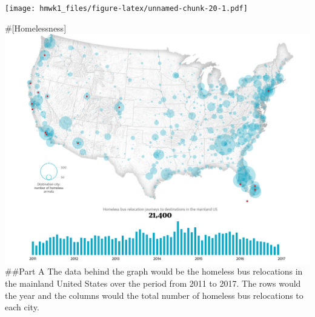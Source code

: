 \documentclass[
]{article}
\newenvironment{Shaded}{\begin{snugshade}}{\end{snugshade}}
\newcommand{\AttributeTok}[1]{\textcolor[rgb]{0.13,0.29,0.53}{#1}}
\newcommand{\DecValTok}[1]{\textcolor[rgb]{0.00,0.00,0.81}{#1}}
\newcommand{\FunctionTok}[1]{\textcolor[rgb]{0.13,0.29,0.53}{\textbf{#1}}}
\newcommand{\NormalTok}[1]{#1}
\newcommand{\OtherTok}[1]{\textcolor[rgb]{0.56,0.35,0.01}{#1}}
\newcommand{\SpecialCharTok}[1]{\textcolor[rgb]{0.81,0.36,0.00}{\textbf{#1}}}
\newcommand{\StringTok}[1]{\textcolor[rgb]{0.31,0.60,0.02}{#1}}
\begin{document}
\begin{Shaded}
\end{Shaded}

\texttt{[image: hmwk1\_files/figure-latex/unnamed-chunk-20-1.pdf]}

\#{[}Homelessness{]} \includegraphics{homelessness_graph.png} \#\#Part A
The data behind the graph would be the homeless bus relocations in the
mainland United States over the period from 2011 to 2017. The rows would
the year and the columns would the total number of homeless bus
relocations to each city.
\end{document}
